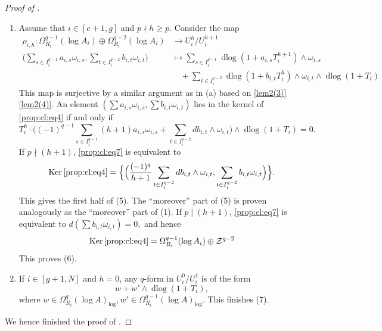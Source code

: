 \documentclass[11pt]{amsart}
\newcommand{\eq}[2]{\begin{equation}\label{#1}#2 \end{equation}}
\newcommand{\ra}{\rightarrow}
\newcommand{\cZ}{\mathcal{Z}}
\newcommand{\Ker}{\operatorname{Ker}}
\newcommand{\dlog}{\operatorname{dlog}}
\theoremstyle{plain}
\theoremstyle{definition}
\numberwithin{equation}{prop}
\begin{document}
\begin{proof}[Proof of ]
\begin{enumerate}[label= (\alph*)]
$$\sum_{s\in I_i^{q-1}} 
T_i^{h}
\cdot 
da_{i,s}\wedge\omega_{i,s}
+ 
T_i^{h}\cdot \Big(
(-1)^{q-1}\sum_{s\in I_i^{q-1}} (h+1)a'_{i,s}\omega_{i,s}
+\sum_{t\in I_i^{q-2}}db_{i,t}\wedge\omega_{i,t}
\Big)\wedge 
\dlog (1+T_i)=0.
$$
Note that in this step, we have used the assumption that $h\ge 2$ and hence $a_{i,s}T_i^{h}d(a_{i,s}T_i^{h})\in V_i^{h+1}$.
As a result,
\begin{align}
\label{lem3c1}
\Ker\eqref{prop:cl:eq3}
&=
\Big\{\Big(
\frac{(-1)^{q}}{h+1}\sum_{t\in I_i^{q-2}}db_{i,t}\wedge\omega_{i,t},
\sum_{s\in I_i^{q-1}} a_{i,s}\omega_{i,s},
\sum_{t\in I_i^{q-2}}b_{i,t}\omega_{i,t}
\Big)
\mid 
d(\sum_{s\in I_i^{q-1}} a_{i,s}\omega_{i,s})=0
\Big\}
\end{align}
This proves the first half of (4).
The ``moreover'' part of (4) is proven analogously as the ``moreover'' part of (1).

\item 
Assume that $i\in [e+1,g]$ and $p\nmid h\ge p$.
Consider the map
\begin{align} 
\label{prop:cl:eq4}
\rho_{i,h}:
\Omega^{q-1}_{R_i}(\log A_i)
\oplus
\Omega^{q-2}_{R_i}(\log A_i)
&\ra
U_i^{h}/U_i^{h+1}
\\
\Big(
\sum_{s\in I_i^{q-1}} a_{i,s}\omega_{i,s},
\sum_{t\in I_i^{q-2}} b_{i,t}\omega_{i,t}
\Big)
&\mapsto
\sum_{s\in I_i^{q-1}} \dlog(1+a_{i,s}T_i^{h+1})\wedge\omega_{i,s}
\nonumber
\\
&\quad 
+\sum_{t\in I_i^{q-2}}
\dlog(1+b_{i,t}T_i^{h})\wedge\omega_{i,t}\wedge \dlog (1+T_i)
\nonumber
\end{align}
This map is surjective by a similar argument as in (a) based on \eqref{lem2(3)}\eqref{lem2(4)}.
An element
$(\sum a_{i,s}\omega_{i,s},
\sum b_{i,t}\omega_{i,t})$ lies in the kernel of \eqref{prop:cl:eq4} if and only if
\eq{prop:cl:eq7}{
T_i^{h}\cdot \Big(
(-1)^{q-1} \sum_{s\in I_i^{q-1}} (h+1)a_{i,s}\omega_{i,s}
+\sum_{t\in I_i^{q-2}}db_{i,t}\wedge\omega_{i,t}
\Big)\wedge 
\dlog (1+T_i)=0.
}
If $p\nmid (h+1)$, \eqref{prop:cl:eq7} is equivalent to
$$\Ker\eqref{prop:cl:eq4}
=
\Big\{\Big(
\frac{(-1)^{q}}{h+1}
\sum_{t\in I_i^{q-2}}db_{i,t}\wedge\omega_{i,t},
\sum_{t\in I_i^{q-2}}b_{i,t}\omega_{i,t}
\Big)
\Big\}.
$$
This gives the first half of (5).
The ``moreover'' part of (5) is proven analogously as the ``moreover'' part of (1).
If $p\mid (h+1)$, 
\eqref{prop:cl:eq7} is equivalent to
$d(\sum b_{i,t}\omega_{i,t})=0,$
and hence
$$\Ker\eqref{prop:cl:eq4}
=\Omega^{q-1}_{R_i}(\log A_i)
\oplus 
\cZ^{q-2}
$$
This proves (6).


\item 
If $i\in [g+1,N]$ and $h=0$, any $q$-form in $U_i^{0}/U_i^{1}$ is of the form
\eq{prop:cl:eq5}{
w+w'
\wedge \dlog (1+T_i),
}
where $w\in \Omega^q_{R_i}(\log A)_{\log},
w'\in \Omega^{q-1}_{R_i}(\log A)_{\log}$.
This finishes (7).
\end{enumerate}
We hence finished the proof of .
\end{proof}
\end{document}
